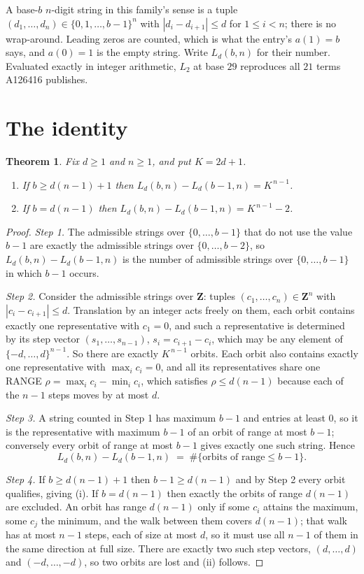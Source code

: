 \documentclass[11pt,a4paper]{article}
\theoremstyle{plain}
\newtheorem{theorem}{Theorem}
\theoremstyle{definition}
\begin{document}
A base-$b$ $n$-digit string in this family's sense is a tuple
$(d_1,\dots,d_n)\in\{0,1,\dots,b-1\}^{n}$ with $|d_i-d_{i+1}|\le d$ for $1\le i<n$; there
is no wrap-around. Leading zeros are counted, which is what the entry's $a(1)=b$ says, and
$a(0)=1$ is the empty string. Write $L_d(b,n)$ for their number. Evaluated exactly in integer
arithmetic, $L_{2}$ at base $29$ reproduces all $21$ terms A126416 publishes.

\section{The identity}

\begin{theorem}
Fix $d\ge1$ and $n\ge1$, and put $K=2d+1$.
\begin{enumerate}
\item[(i)] If $b\ge d(n-1)+1$ then $L_d(b,n)-L_d(b-1,n)=K^{\,n-1}$.
\item[(ii)] If $b=d(n-1)$ then $L_d(b,n)-L_d(b-1,n)=K^{\,n-1}-2$.
\end{enumerate}
\end{theorem}

\begin{proof}
\emph{Step 1.} The admissible strings over $\{0,\dots,b-1\}$ that do not use the value $b-1$
are exactly the admissible strings over $\{0,\dots,b-2\}$, so $L_d(b,n)-L_d(b-1,n)$ is the
number of admissible strings over $\{0,\dots,b-1\}$ in which $b-1$ occurs.

\emph{Step 2.} Consider the admissible strings over $\mathbf{Z}$: tuples
$(c_1,\dots,c_n)\in\mathbf{Z}^{n}$ with $|c_i-c_{i+1}|\le d$. Translation by an integer acts
freely on them, each orbit contains exactly one representative with $c_1=0$, and such a
representative is determined by its step vector $(s_1,\dots,s_{n-1})$, $s_i=c_{i+1}-c_i$,
which may be any element of $\{-d,\dots,d\}^{n-1}$. So there are exactly $K^{\,n-1}$ orbits.
Each orbit also contains exactly one representative with $\max_i c_i=0$, and all its
representatives share one RANGE $\rho=\max_ic_i-\min_ic_i$, which satisfies
$\rho\le d(n-1)$ because each of the $n-1$ steps moves by at most $d$.

\emph{Step 3.} A string counted in Step 1 has maximum $b-1$ and entries at least $0$, so it is
the representative with maximum $b-1$ of an orbit of range at most $b-1$; conversely every orbit
of range at most $b-1$ gives exactly one such string. Hence
\[
L_d(b,n)-L_d(b-1,n)\;=\;\#\{\text{orbits of range}\le b-1\} .
\]

\emph{Step 4.} If $b\ge d(n-1)+1$ then $b-1\ge d(n-1)$ and by Step 2 every orbit qualifies,
giving (i). If $b=d(n-1)$ then exactly the orbits of range $d(n-1)$ are excluded. An orbit has
range $d(n-1)$ only if some $c_i$ attains the maximum, some $c_j$ the minimum, and the walk
between them covers $d(n-1)$; that walk has at most $n-1$ steps, each of size at most $d$, so it
must use all $n-1$ of them in the same direction at full size. There are exactly two such step
vectors, $(d,\dots,d)$ and $(-d,\dots,-d)$, so two orbits are lost and (ii) follows.
\end{proof}
\end{document}
